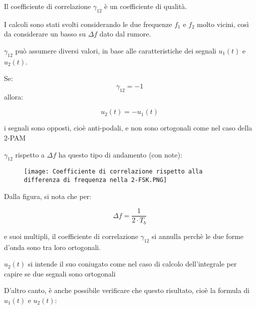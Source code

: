 \begin{tcolorbox}

    Il coefficiente di correlazione $\gamma_{12}$ è un coefficiente di qualità. \newline 

    I calcoli sono stati svolti considerando le due frequenze $f_1$ e $f_2$ molto vicini, 
    così da considerare un basso su $\Delta f$ dato dal rumore. \newline 

    $\gamma_{12}$ può assumere diversi valori, in base alle caratteristiche dei segnali $u_1 (t)$ e $u_2 (t)$. \newline 
    
    Se: 
{
    \Large 
    \begin{equation}
     \gamma_{12} = -1   
    \end{equation}
}
   allora: 
   
   {
    \Large 
    \begin{equation}
     u_2 (t) = -u_1 (t)   
    \end{equation}
   }

    i segnali sono opposti, cioè anti-podali, 
    e non sono ortogonali come nel caso della  2-PAM
\end{tcolorbox}

$\gamma_{12}$ rispetto a $\Delta f$ ha questo tipo di andamento (con note): 

\begin{figure}[h]
    \centering
    \texttt{[image: Coefficiente di correlazione rispetto alla differenza di frequenza nella 2-FSK.PNG]}
\end{figure}

Dalla figura, si nota che per: 

{
    \Large 
    \begin{equation}
        \Delta f = \frac{1}{2 \cdot T_b}
    \end{equation}
}

e suoi multipli, 
il coefficiente di correlazione $\gamma_{12}$ si annulla perchè le due forme d'onda sono tra loro ortogonali. \newline 

\begin{tcolorbox}

$u_2 (t)$ si intende il suo coniugato come nel caso di calcolo dell'integrale per capire se due segnali sono ortogonali
\end{tcolorbox}

D'altro canto, 
è anche possibile verificare che questo risultato, cioè la formula di $u_1 (t)$ e $u_2 (t)$: 

